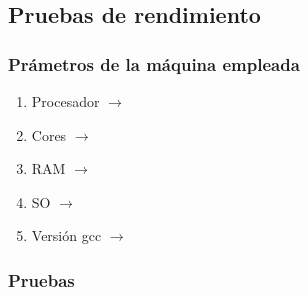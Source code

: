 \documentclass[12pt]{article}
\begin{document}
        \subsection{Pruebas de rendimiento}
        \subsubsection{Prámetros de la máquina empleada}
            \begin{enumerate}
                \item Procesador $\rightarrow$ 
                \item Cores $\rightarrow$ 
                \item RAM $\rightarrow$ 
                \item SO $\rightarrow$ 
                \item Versión gcc $\rightarrow$ 
            \end{enumerate}
        \subsubsection{Pruebas}
        
        
\end{document}

